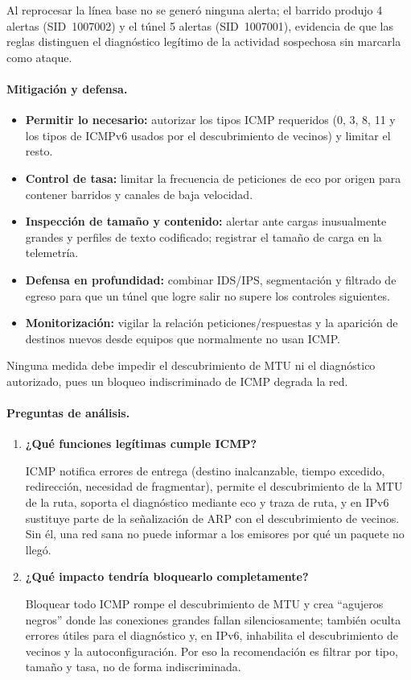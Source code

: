 Al reprocesar la línea base no se generó ninguna alerta; el barrido produjo 4 alertas (SID~1007002) y el túnel 5 alertas (SID~1007001), evidencia de que las reglas distinguen el diagnóstico legítimo de la actividad sospechosa sin marcarla como ataque.

\paragraph{Mitigación y defensa.}
\begin{itemize}
	\item \textbf{Permitir lo necesario:} autorizar los tipos ICMP requeridos (0, 3, 8, 11 y los tipos de ICMPv6 usados por el descubrimiento de vecinos) y limitar el resto.
	\item \textbf{Control de tasa:} limitar la frecuencia de peticiones de eco por origen para contener barridos y canales de baja velocidad.
	\item \textbf{Inspección de tamaño y contenido:} alertar ante cargas inusualmente grandes y perfiles de texto codificado; registrar el tamaño de carga en la telemetría.
	\item \textbf{Defensa en profundidad:} combinar IDS/IPS, segmentación y filtrado de egreso para que un túnel que logre salir no supere los controles siguientes.
	\item \textbf{Monitorización:} vigilar la relación peticiones/respuestas y la aparición de destinos nuevos desde equipos que normalmente no usan ICMP.
\end{itemize}
Ninguna medida debe impedir el descubrimiento de MTU ni el diagnóstico autorizado, pues un bloqueo indiscriminado de ICMP degrada la red.

\paragraph{Preguntas de análisis.}
\begin{enumerate}
	\item \textbf{¿Qué funciones legítimas cumple ICMP?}\par
	ICMP notifica errores de entrega (destino inalcanzable, tiempo excedido, redirección, necesidad de fragmentar), permite el descubrimiento de la MTU de la ruta, soporta el diagnóstico mediante eco y traza de ruta, y en IPv6 sustituye parte de la señalización de ARP con el descubrimiento de vecinos. Sin él, una red sana no puede informar a los emisores por qué un paquete no llegó.
	\item \textbf{¿Qué impacto tendría bloquearlo completamente?}\par
	Bloquear todo ICMP rompe el descubrimiento de MTU y crea ``agujeros negros'' donde las conexiones grandes fallan silenciosamente; también oculta errores útiles para el diagnóstico y, en IPv6, inhabilita el descubrimiento de vecinos y la autoconfiguración. Por eso la recomendación es filtrar por tipo, tamaño y tasa, no de forma indiscriminada.
\end{enumerate}

